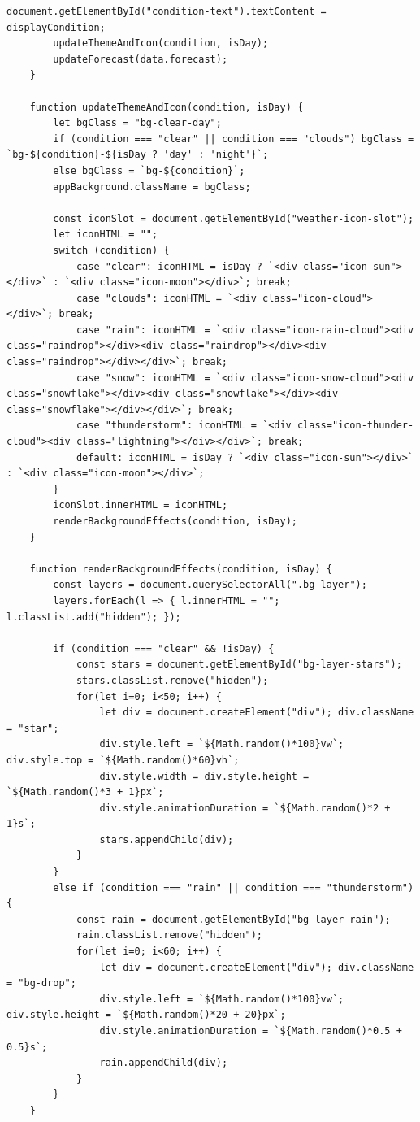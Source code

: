 \documentclass[12pt,a4paper]{article}
\begin{document}
\begin{lstlisting}[caption=Frontend Logic (static/app.js)]
        document.getElementById("condition-text").textContent = displayCondition;
        updateThemeAndIcon(condition, isDay);
        updateForecast(data.forecast);
    }

    function updateThemeAndIcon(condition, isDay) {
        let bgClass = "bg-clear-day";
        if (condition === "clear" || condition === "clouds") bgClass = `bg-${condition}-${isDay ? 'day' : 'night'}`;
        else bgClass = `bg-${condition}`;
        appBackground.className = bgClass;
        
        const iconSlot = document.getElementById("weather-icon-slot");
        let iconHTML = "";
        switch (condition) {
            case "clear": iconHTML = isDay ? `<div class="icon-sun"></div>` : `<div class="icon-moon"></div>`; break;
            case "clouds": iconHTML = `<div class="icon-cloud"></div>`; break;
            case "rain": iconHTML = `<div class="icon-rain-cloud"><div class="raindrop"></div><div class="raindrop"></div><div class="raindrop"></div></div>`; break;
            case "snow": iconHTML = `<div class="icon-snow-cloud"><div class="snowflake"></div><div class="snowflake"></div><div class="snowflake"></div></div>`; break;
            case "thunderstorm": iconHTML = `<div class="icon-thunder-cloud"><div class="lightning"></div></div>`; break;
            default: iconHTML = isDay ? `<div class="icon-sun"></div>` : `<div class="icon-moon"></div>`;
        }
        iconSlot.innerHTML = iconHTML;
        renderBackgroundEffects(condition, isDay);
    }

    function renderBackgroundEffects(condition, isDay) {
        const layers = document.querySelectorAll(".bg-layer");
        layers.forEach(l => { l.innerHTML = ""; l.classList.add("hidden"); });

        if (condition === "clear" && !isDay) {
            const stars = document.getElementById("bg-layer-stars");
            stars.classList.remove("hidden");
            for(let i=0; i<50; i++) {
                let div = document.createElement("div"); div.className = "star";
                div.style.left = `${Math.random()*100}vw`; div.style.top = `${Math.random()*60}vh`; 
                div.style.width = div.style.height = `${Math.random()*3 + 1}px`;
                div.style.animationDuration = `${Math.random()*2 + 1}s`;
                stars.appendChild(div);
            }
        }
        else if (condition === "rain" || condition === "thunderstorm") {
            const rain = document.getElementById("bg-layer-rain");
            rain.classList.remove("hidden");
            for(let i=0; i<60; i++) {
                let div = document.createElement("div"); div.className = "bg-drop";
                div.style.left = `${Math.random()*100}vw`; div.style.height = `${Math.random()*20 + 20}px`;
                div.style.animationDuration = `${Math.random()*0.5 + 0.5}s`;
                rain.appendChild(div);
            }
        }
    }


\end{lstlisting}
\end{document}
